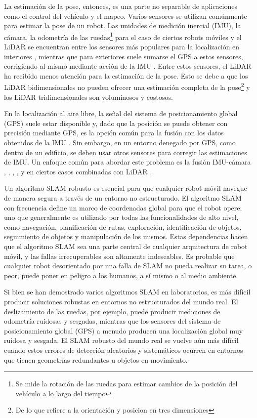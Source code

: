 La estimación de la pose, entonces, es una parte no separable de aplicaciones como el control del vehículo y el mapeo. Varios sensores se utilizan comúnmente para estimar la pose de un robot. Las unidades de medición inercial (IMU), la cámara, la odometría de las ruedas\footnote{Se mide la rotación de las ruedas para estimar cambios de la posición del vehículo a lo largo del tiempo} para el caso de ciertos robots móviles  y el LiDAR se encuentran entre los sensores más populares para la localización en interiores \cite{delrosario2016}, mientras que para exteriores suele sumarse el GPS a estos sensores, corrigiendo al mismo mediante acción de la IMU \cite{caron2006}. Entre estos sensores, el LiDAR ha recibido menos atención para la estimación de la pose. Esto se debe a que los LiDAR bidimensionales no pueden ofrecer una estimación completa de la pose\footnote{De lo que refiere a la orientación y posicion en tres dimensiones} y los LiDAR tridimensionales son voluminosos y costosos.

En la localización al aire libre, la señal del sistema de posicionamiento global (GPS) suele estar disponible y, dado que la posición se puede obtener con precisión mediante GPS, es la opción común para la fusión con los datos obtenidos de la IMU \cite{engel2014}. Sin embargo, en un entorno denegado por GPS, como dentro de un edificio, se deben usar otros sensores para corregir las estimaciones de IMU. Un enfoque común para abordar este problema es la fusión IMU-cámara \cite{mirzaei2008}, \cite{hesch2009}, \cite{chambers2014}, \cite{hesch2013}, y en ciertos casos combinadas con LiDAR \cite{lee2016}.

Un algoritmo SLAM robusto es esencial para que cualquier robot móvil navegue de manera segura a través de un entorno no estructurado. El algoritmo SLAM con frecuencia define un marco de coordenadas global para que el robot opere; uno que generalmente es utilizado por todas las funcionalidades de alto nivel, como navegación, planificación de rutas, exploración, identificación de objetos, seguimiento de objetos y manipulación de los mismos. Estas dependencias hacen que el algoritmo SLAM sea una parte central de cualquier arquitectura de robot móvil, y las fallas irrecuperables son altamente indeseables. Es probable que cualquier robot desorientado por una falla de SLAM no pueda realizar su tarea, o peor, puede poner en peligro a los humanos, a sí mismo o al medio ambiente.

Si bien se han demostrado varios algoritmos SLAM en laboratorios, es más difícil producir soluciones robustas en entornos no estructurados del mundo real. El deslizamiento de las ruedas, por ejemplo, puede producir mediciones de odometría ruidosas y sesgadas, mientras que los sensores del sistema de posicionamiento global (GPS) a menudo producen una localización global muy ruidosa y sesgada. El SLAM robusto del mundo real se vuelve aún más difícil cuando estos errores de detección aleatorios y sistemáticos ocurren en entornos que tienen geometrías redundantes u objetos en movimiento.